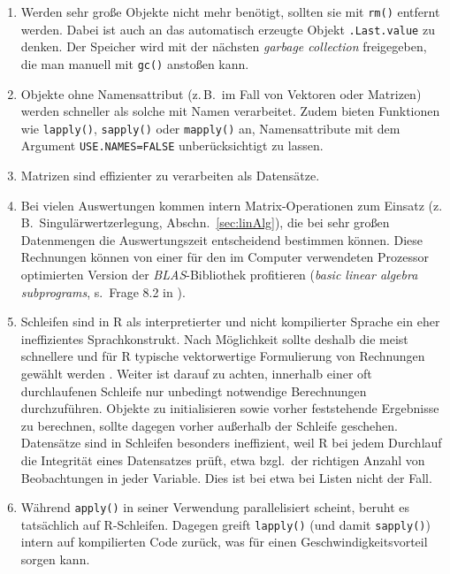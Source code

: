 \begin{enumerate}
\item Werden sehr große Objekte nicht mehr benötigt, sollten sie mit \lstinline!rm()! entfernt werden. Dabei ist auch an das automatisch erzeugte Objekt \lstinline!.Last.value! zu denken. Der Speicher wird mit der nächsten \emph{garbage collection} freigegeben, die man manuell mit \lstinline!gc()! anstoßen kann.
\item Objekte ohne Namensattribut (z.\,B.\ im Fall von Vektoren oder Matrizen) werden schneller als solche mit Namen verarbeitet. Zudem bieten Funktionen wie \lstinline!lapply()!, \lstinline!sapply()! oder \lstinline!mapply()! an, Namensattribute mit dem Argument \lstinline!USE.NAMES=FALSE! unberücksichtigt zu lassen.
\item Matrizen sind effizienter zu verarbeiten als Datensätze.
\item \label{item:blas} Bei vielen Auswertungen kommen intern Matrix-Operationen zum Einsatz (z.\,B.\ Singulärwertzerlegung, Abschn.\ \ref{sec:linAlg}), die bei sehr großen Datenmengen die Auswertungszeit entscheidend bestimmen können. Diese Rechnungen können von einer für den im Computer verwendeten Prozessor optimierten Version der \emph{BLAS}-Bibliothek profitieren (\emph{basic linear algebra subprograms}, s.\ Frage 8.2 in ).
\item Schleifen sind in R als interpretierter und nicht kompilierter Sprache ein eher ineffizientes Sprachkonstrukt. Nach Möglichkeit sollte deshalb die meist schnellere und für R typische vektorwertige Formulierung von Rechnungen gewählt werden \cite{Ligges2008}. Weiter ist darauf zu achten, innerhalb einer oft durchlaufenen Schleife nur unbedingt notwendige Berechnungen durchzuführen. Objekte zu initialisieren sowie vorher feststehende Ergebnisse zu berechnen, sollte dagegen vorher außerhalb der Schleife geschehen. Datensätze sind in Schleifen besonders ineffizient, weil R bei jedem Durchlauf die Integrität eines Datensatzes prüft, etwa bzgl.\ der richtigen Anzahl von Beobachtungen in jeder Variable. Dies ist bei etwa bei Listen nicht der Fall.
\item Während \lstinline!apply()! in seiner Verwendung parallelisiert scheint, beruht es tatsächlich auf R-Schleifen. Dagegen greift \lstinline!lapply()! (und damit \lstinline!sapply()!) intern auf kompilierten Code zurück, was für einen Geschwindigkeitsvorteil sorgen kann.
\end{enumerate}

